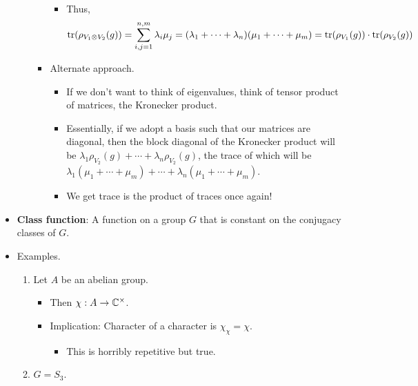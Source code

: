 \documentclass[../notes.tex]{subfiles}
\begin{document}
\begin{itemize}
\begin{enumerate}[resume]
\begin{itemize}
\begin{itemize}
                \item Thus,
                \begin{equation*}
                    \tr(\rho_{V_1\otimes V_2}(g)) = \sum_{i,j=1}^{n,m}\lambda_i\mu_j
                    = (\lambda_1+\cdots+\lambda_n)(\mu_1+\cdots+\mu_m)
                    = \tr(\rho_{V_1}(g))\cdot\tr(\rho_{V_2}(g))
                \end{equation*}
            \end{itemize}
            \item Alternate approach.
            \begin{itemize}
                \item If we don't want to think of eigenvalues, think of tensor product of matrices, the Kronecker product.
                \item Essentially, if we adopt a basis such that our matrices are diagonal, then the block diagonal of the Kronecker product will be $\lambda_1\rho_{V_2}(g)+\cdots+\lambda_n\rho_{V_2}(g)$, the trace of which will be $\lambda_1(\mu_1+\cdots+\mu_m)+\cdots+\lambda_n(\mu_1+\cdots+\mu_m)$.
                \item We get trace is the product of traces once again!
            \end{itemize}
        \end{itemize}
    \end{enumerate}
    \item \textbf{Class function}: A function on a group $G$ that is constant on the conjugacy classes of $G$.
    \item Examples.
    \begin{enumerate}
        \item Let $A$ be an abelian group.
        \begin{itemize}
            \item Then $\chi:A\to\mathbb{C}^\times$.
            \item Implication: Character of a character is $\chi_\chi=\chi$.
            \begin{itemize}
                \item This is horribly repetitive but true.
            \end{itemize}
        \end{itemize}
        \item $G=S_3$.
        \begin{table}[h!]
            \centering
            \small
            \renewcommand{\arraystretch}{1.4}
            \begin{tabular}{c|c|c|c|}

\end{tabular}
\end{table}
\end{enumerate}
\end{itemize}
\end{document}
